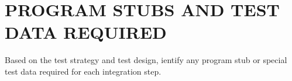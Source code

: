 \section{PROGRAM STUBS AND TEST DATA REQUIRED}
Based on the test strategy and test design, ientify any program stub or special test data required for each integration step.